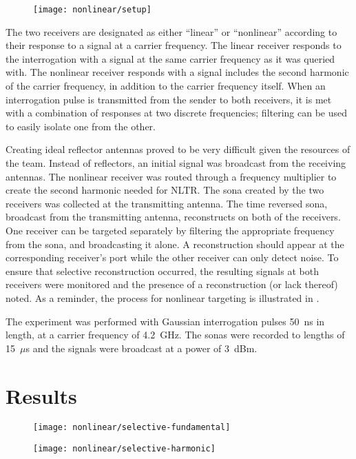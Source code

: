 \begin{figure}[t]
\centering
\texttt{[image: nonlinear/setup]}
    \caption[]{}
    \label{fig:selective-setup}
\end{figure}

The two receivers are designated as either ``linear'' or ``nonlinear'' according to their response to a signal at a carrier frequency. The linear receiver responds to the interrogation with a signal at the same carrier frequency as it was queried with. The nonlinear receiver responds with a signal includes the second harmonic of the carrier frequency, in addition to the carrier frequency itself. When an interrogation pulse is transmitted from the sender to both receivers, it is met with a combination of responses at two discrete frequencies; filtering can be used to easily isolate one from the other.

Creating ideal reflector antennas proved to be very difficult given the resources of the team.  Instead of reflectors, an initial signal was broadcast from the receiving antennas.  The nonlinear receiver was routed through a frequency multiplier to create the second harmonic needed for NLTR.  The sona created by the two receivers was collected at the transmitting antenna.  The time reversed sona, broadcast from the transmitting antenna, reconstructs on both of the receivers.  One receiver can be targeted separately by filtering the appropriate frequency from the sona, and broadcasting it alone. A reconstruction should appear at the corresponding receiver’s port while the other receiver can only detect noise. To ensure that selective reconstruction occurred, the resulting signals at both receivers were monitored and the presence of a reconstruction (or lack thereof) noted. As a reminder, the process for nonlinear targeting is illustrated in .

The experiment was performed with Gaussian interrogation pulses 50~ns in length, at a carrier frequency of 4.2~GHz. The sonas were recorded to lengths of 15~$\mu$s and the signals were broadcast at a power of 3~dBm.

\section{Results}
\label{sec:selective-results}

\begin{figure}[h]
\centering
\texttt{[image: nonlinear/selective-fundamental]}
    \caption[]{}
    \label{fig:selective-fundamental}
\end{figure}
\begin{figure}[h]
\centering
\texttt{[image: nonlinear/selective-harmonic]}
    \caption[]{}
    \label{fig:selective-harmonic}
\end{figure}

